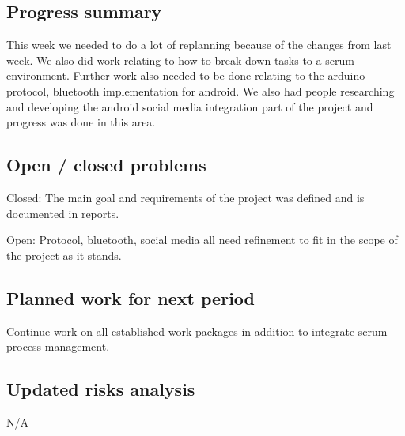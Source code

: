 \subsection{Progress summary}
This week we needed to do a lot of replanning because of the changes from last week. We also did work relating to how to break down tasks to a scrum environment. Further work also needed to be done relating to the arduino protocol, bluetooth implementation for android. We also had people researching and developing the android social media integration part of the project and progress was done in this area.

\subsection{Open / closed problems}
Closed: The main goal and requirements of the project was defined and is documented in reports.

Open:
Protocol, bluetooth, social media all need refinement to fit in the scope of the project as it stands.


\subsection{Planned work for next period}
Continue work on all established work packages in addition to integrate scrum process management.

\subsection{Updated risks analysis}
N/A